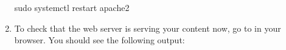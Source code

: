 \documentclass[letterpaper,10pt,english]{sphinxmanual}
\begin{document}
\begin{enumerate}
\begin{sphinxVerbatim}[commandchars=\\\{\}]
\PYGZdl{} sudo systemctl restart apache2
\end{sphinxVerbatim}

\item {} 
\sphinxAtStartPar
To check that the web server is serving your content now, go to  in your browser. You should see the following output:
\begin{quote}

\sphinxAtStartPar
{}
\end{quote}

\end{enumerate}
\end{document}

